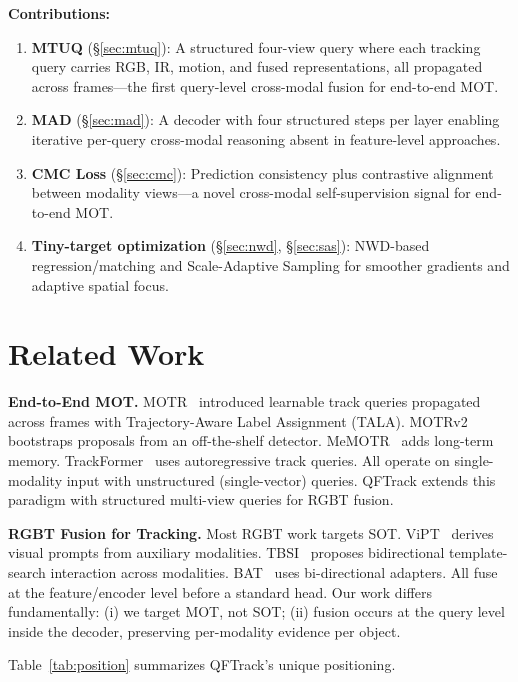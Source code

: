 \documentclass[10pt,twocolumn,letterpaper]{article}
\begin{document}
\textbf{Contributions:}
\begin{enumerate}
\item \textbf{MTUQ} (\S\ref{sec:mtuq}): A structured four-view query where each tracking query carries RGB, IR, motion, and fused representations, all propagated across frames---the first query-level cross-modal fusion for end-to-end MOT.
\item \textbf{MAD} (\S\ref{sec:mad}): A decoder with four structured steps per layer enabling iterative per-query cross-modal reasoning absent in feature-level approaches.
\item \textbf{CMC Loss} (\S\ref{sec:cmc}): Prediction consistency plus contrastive alignment between modality views---a novel cross-modal self-supervision signal for end-to-end MOT.
\item \textbf{Tiny-target optimization} (\S\ref{sec:nwd}, \S\ref{sec:sas}): NWD-based regression/matching and Scale-Adaptive Sampling for smoother gradients and adaptive spatial focus.
\end{enumerate}

\section{Related Work}
\label{sec:related}

\textbf{End-to-End MOT.}
MOTR~\cite{motr} introduced learnable track queries propagated across frames with Trajectory-Aware Label Assignment (TALA).
MOTRv2~\cite{motrv2} bootstraps proposals from an off-the-shelf detector.
MeMOTR~\cite{memotr} adds long-term memory.
TrackFormer~\cite{trackformer} uses autoregressive track queries.
All operate on single-modality input with unstructured (single-vector) queries.
QFTrack extends this paradigm with structured multi-view queries for RGBT fusion.

\textbf{RGBT Fusion for Tracking.}
Most RGBT work targets SOT.
ViPT~\cite{vipt_zhu2023} derives visual prompts from auxiliary modalities.
TBSI~\cite{tbsi_hui2023} proposes bidirectional template-search interaction across modalities.
BAT~\cite{bat_cao2024} uses bi-directional adapters.
All fuse at the feature/encoder level before a standard head.
Our work differs fundamentally: (i) we target MOT, not SOT; (ii) fusion occurs at the query level inside the decoder, preserving per-modality evidence per object.

Table~\ref{tab:position} summarizes QFTrack's unique positioning.
\end{document}
